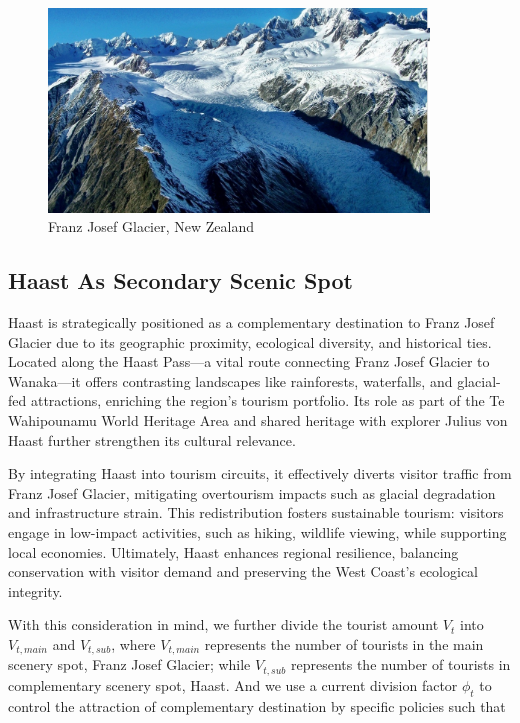 \documentclass{mcmthesis}
\begin{document}
\begin{figure}[H]
  \centering
  \includegraphics[width=0.9\textwidth]{figures/glaicer2.png}
  \caption{Franz Josef Glacier, New Zealand}
  \label{Fig.3}
\end{figure}

\subsection{Haast As Secondary Scenic Spot}
Haast is strategically positioned as a complementary destination to Franz Josef Glacier due to its geographic proximity, ecological diversity, and historical ties.
Located along the Haast Pass—a vital route connecting Franz Josef Glacier to Wanaka—it offers contrasting landscapes like rainforests, waterfalls, and glacial-fed attractions, enriching the region's tourism portfolio.
Its role as part of the Te Wahipounamu World Heritage Area and shared heritage with explorer Julius von Haast further strengthen its cultural relevance.

By integrating Haast into tourism circuits, it effectively diverts visitor traffic from Franz Josef Glacier, mitigating overtourism impacts such as glacial degradation and infrastructure strain.
This redistribution fosters sustainable tourism: visitors engage in low-impact activities, such as hiking, wildlife viewing, while supporting local economies. 
Ultimately, Haast enhances regional resilience, balancing conservation with visitor demand and preserving the West Coast's ecological integrity.

With this consideration in mind, we further divide the tourist amount $V_t$ into $V_{t,main}$ and $V_{t,sub}$, where $V_{t,main}$ represents the number of tourists 
in the main scenery spot, Franz Josef Glacier; while $V_{t,sub}$ represents the number of tourists in complementary scenery spot, Haast.
And we use a current division factor $\phi_t$ to control the attraction of complementary destination by specific policies such that\cite{bertsimas1998air}
\end{document}

